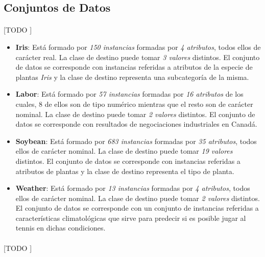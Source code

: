 \documentclass{article}
\begin{document}
		\subsection{Conjuntos de Datos}
		\label{sec:datasets}

			\paragraph{}
			[TODO ]

			\begin{itemize}

				\item \textbf{Iris}\cite{dataset:iris}: Está formado por \emph{150 instancias} formadas por \emph{4 atributos}, todos ellos de carácter real. La clase de destino puede tomar \emph{3 valores} distintos. El conjunto de datos se corresponde con instancias referidas a atributos de la especie de plantas \emph{Iris} y la clase de destino representa una subcategoría de la misma.

				\item \textbf{Labor}\cite{dataset:labor}: Está formado por \emph{57 instancias} formadas por \emph{16 atributos} de los cuales, 8 de ellos son de tipo numérico mientras que el resto son de carácter nominal. La clase de destino puede tomar \emph{2 valores} distintos. El conjunto de datos se corresponde con resultados de negociaciones industriales en Canadá.

				\item \textbf{Soybean}\cite{dataset:soybean}: Está formado por \emph{683 instancias} formadas por \emph{35 atributos}, todos ellos de carácter nominal. La clase de destino puede tomar \emph{19 valores} distintos. El conjunto de datos se corresponde con instancias referidas a atributos de plantas y la clase de destino representa el tipo de planta.

				\item	\textbf{Weather}\cite{dataset:weather}: Está formado por \emph{13 instancias} formadas por \emph{4 atributos}, todos ellos de carácter nominal. La clase de destino puede tomar \emph{2 valores} distintos. El conjunto de datos se corresponde con un conjunto de instancias referidas a características climatológicas que sirve para predecir si es posible jugar al tennis en dichas condiciones.

			\end{itemize}

			\paragraph{}
			[TODO ]
\end{document}
